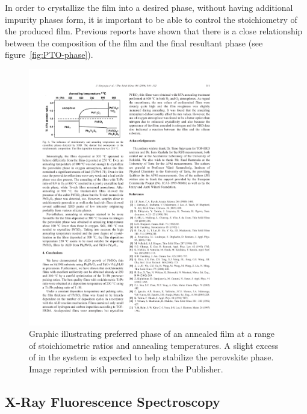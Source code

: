 In order to crystallize the film into a desired phase, without having additional impurity phases form, it is important to be able to control the stoichiometry of the produced film. Previous reports have shown that there is a close relationship between the composition of the film and the final resultant phase (see figure~\vref{fig:PTO-phase}).\cite{harjuoja_2006} 

\begin{figure}[tb]
   \centering
   \includegraphics[width=0.75\textwidth]{./figures/dataanalysis/PTO-phase}
   \caption[Preferred Phase vs. Stoichiometric Ratio]{Graphic illustrating preferred phase of an annealed %
   		film at a range of stoichiometric ratios and annealing temperatures. A slight excess of  %
		in the system is expected to help stabilize the perovskite \PTO{} phase.\cite{harjuoja_2006}\\
		{\tiny Image reprinted with permission from the Publisher.}}
   \label{fig:PTO-phase}
\end{figure}

\lipsum


\subsection{X-Ray Fluorescence Spectroscopy}
\label{sec:Methods-XRF}

